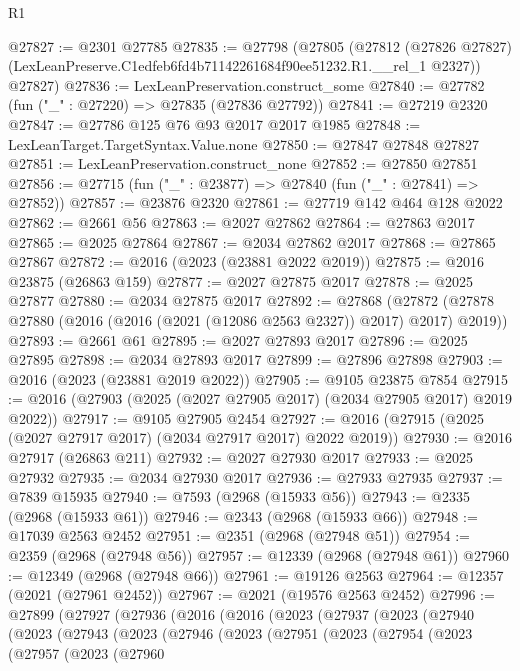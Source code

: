 \begin{lexlean}{R1}
\begin{coremodule}
@27827 := @2301 @27785
@27835 := @27798
    (@27805
      (@27812 (@27826 @27827) (LexLeanPreserve.C1edfeb6fd4b71142261684f90ee51232.R1.__rel_1 @2327))
      @27827)
@27836 := LexLeanPreservation.construct_some
@27840 := @27782 (fun ("_" : @27220) => @27835 (@27836 @27792))
@27841 := @27219 @2320
@27847 := @27786 @125 @76 @93 @2017 @2017 @1985
@27848 := LexLeanTarget.TargetSyntax.Value.none
@27850 := @27847 @27848 @27827
@27851 := LexLeanPreservation.construct_none
@27852 := @27850 @27851
@27856 := @27715 (fun ("_" : @23877) => @27840 (fun ("_" : @27841) => @27852))
@27857 := @23876 @2320
@27861 := @27719 @142 @464 @128 @2022
@27862 := @2661 @56
@27863 := @2027 @27862
@27864 := @27863 @2017
@27865 := @2025 @27864
@27867 := @2034 @27862 @2017
@27868 := @27865 @27867
@27872 := @2016 (@2023 (@23881 @2022 @2019))
@27875 := @2016 @23875 (@26863 @159)
@27877 := @2027 @27875 @2017
@27878 := @2025 @27877
@27880 := @2034 @27875 @2017
@27892 := @27868
    (@27872 (@27878 @27880 (@2016 (@2016 (@2021 (@12086 @2563 @2327)) @2017) @2017) @2019))
@27893 := @2661 @61
@27895 := @2027 @27893 @2017
@27896 := @2025 @27895
@27898 := @2034 @27893 @2017
@27899 := @27896 @27898
@27903 := @2016 (@2023 (@23881 @2019 @2022))
@27905 := @9105 @23875 @7854
@27915 := @2016 (@27903 (@2025 (@2027 @27905 @2017) (@2034 @27905 @2017) @2019 @2022))
@27917 := @9105 @27905 @2454
@27927 := @2016 (@27915 (@2025 (@2027 @27917 @2017) (@2034 @27917 @2017) @2022 @2019))
@27930 := @2016 @27917 (@26863 @211)
@27932 := @2027 @27930 @2017
@27933 := @2025 @27932
@27935 := @2034 @27930 @2017
@27936 := @27933 @27935
@27937 := @7839 @15935
@27940 := @7593 (@2968 (@15933 @56))
@27943 := @2335 (@2968 (@15933 @61))
@27946 := @2343 (@2968 (@15933 @66))
@27948 := @17039 @2563 @2452
@27951 := @2351 (@2968 (@27948 @51))
@27954 := @2359 (@2968 (@27948 @56))
@27957 := @12339 (@2968 (@27948 @61))
@27960 := @12349 (@2968 (@27948 @66))
@27961 := @19126 @2563
@27964 := @12357 (@2021 (@27961 @2452))
@27967 := @2021 (@19576 @2563 @2452)
@27996 := @27899
    (@27927
      (@27936
        (@2016
          (@2016
            (@2023
              (@27937
                (@2023
                  (@27940
                    (@2023
                      (@27943
                        (@2023
                          (@27946
                            (@2023
                              (@27951
                                (@2023
                                  (@27954
                                    (@2023
                                      (@27957
                                        (@2023
                                          (@27960

\end{coremodule}
\end{lexlean}
